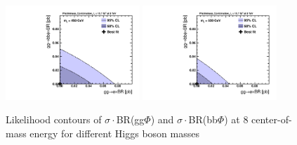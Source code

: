 \begin{figure}[!h]
\begin{center}
 \includegraphics[width=0.45\textwidth]{MSSM/PLOTS/cmb-ggH-bbH-scan-GGH-BBH-450.pdf}
 \includegraphics[width=0.45\textwidth]{MSSM/PLOTS/cmb-ggH-bbH-scan-GGH-BBH-500.pdf}
 \caption{Likelihood contours of $\sigma\cdot$BR(gg$\Phi$) and $\sigma\cdot$BR(bb$\Phi$) at 8 \TeV center-of-mass energy for different Higgs boson masses}
  \label{fig:contour3}\end{center}\end{figure}


